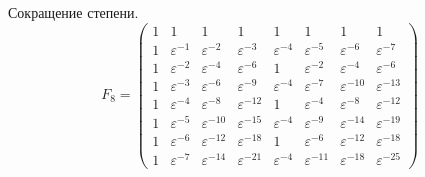 Сокращение степени.
\[
    F_8
    = \begin{pmatrix}
          1 & 1                & 1                 & 1                 & 1                & 1                 & 1                 & 1                 \\
          1 & \varepsilon^{-1} & \varepsilon^{-2}  & \varepsilon^{-3}  & \varepsilon^{-4} & \varepsilon^{-5}  & \varepsilon^{-6}  & \varepsilon^{-7} \\
          1 & \varepsilon^{-2} & \varepsilon^{-4}  & \varepsilon^{-6}  & 1                & \varepsilon^{-2}  & \varepsilon^{-4}  & \varepsilon^{-6} \\
          1 & \varepsilon^{-3} & \varepsilon^{-6}  & \varepsilon^{-9}  & \varepsilon^{-4} & \varepsilon^{-7}  & \varepsilon^{-10} & \varepsilon^{-13} \\
          1 & \varepsilon^{-4} & \varepsilon^{-8}  & \varepsilon^{-12} & 1                & \varepsilon^{-4}  & \varepsilon^{-8}  & \varepsilon^{-12} \\
          1 & \varepsilon^{-5} & \varepsilon^{-10} & \varepsilon^{-15} & \varepsilon^{-4} & \varepsilon^{-9}  & \varepsilon^{-14} & \varepsilon^{-19} \\
          1 & \varepsilon^{-6} & \varepsilon^{-12} & \varepsilon^{-18} & 1                & \varepsilon^{-6}  & \varepsilon^{-12} & \varepsilon^{-18} \\
          1 & \varepsilon^{-7} & \varepsilon^{-14} & \varepsilon^{-21} & \varepsilon^{-4} & \varepsilon^{-11} & \varepsilon^{-18} & \varepsilon^{-25}
    \end{pmatrix}
\]

